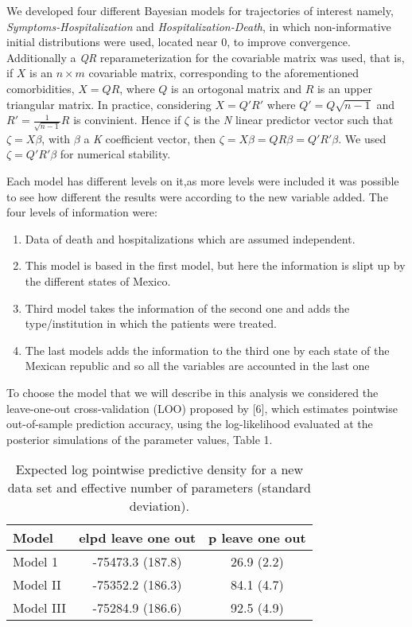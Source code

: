 \documentclass[10pt,letterpaper]{article}
\begin{document}
We developed four different Bayesian models for trajectories of interest
namely, \emph{Symptoms-Hospitalization} and
\emph{Hospitalization-Death}, in which non-informative initial
distributions were used, located near \(0\), to improve convergence.
Additionally a \textit{QR} reparameterization for the covariable matrix
was used, that is, if \(X\) is an \(n \times m\) covariable matrix,
corresponding to the aforementioned comorbidities, \(X=QR\), where \(Q\)
is an ortogonal matrix and \(R\) is an upper triangular matrix. In
practice, considering \(X=Q'R'\) where \(Q'=Q\sqrt{n-1}\) and
\(R'=\frac{1}{\sqrt{n-1}}R\) is convinient. Hence if \(\zeta\) is the
\textit{N} linear predictor vector such that \(\zeta=X\beta\), with
\(\beta\) a \textit{K} coefficient vector, then
\(\zeta=X\beta=QR\beta=Q'R'\beta\). We used \(\zeta=Q'R'\beta\) for
numerical stability.

Each model has different levels on it,as more levels were included it
was possible to see how different the results were according to the new
variable added. The four levels of information were:

\begin{enumerate}
  \item Data of death and hospitalizations which are assumed independent.
  \item This model is based in the first model, but here the information is slipt up by the different states of Mexico.
  \item Third model takes the information of the second one and adds the type/institution in which the patients were treated.
  \item The last models adds the information to the third one by each state of the Mexican republic and so all the variables are accounted in the last one
\end{enumerate}

To choose the model that we will describe in this analysis we considered
the leave-one-out cross-validation (LOO) proposed by {[}6{]}, which
estimates pointwise out-of-sample prediction accuracy, using the
log-likelihood evaluated at the posterior simulations of the parameter
values, Table 1.

\begin{table}[!htb]
\centering
\begin{tabular}{lcc}
\hline
{\textbf{Model}} & {\textbf{elpd leave one out}} & {\textbf{p leave one out}} \\
\hline Model 1  &  -75473.3 (187.8) & 26.9 (2.2) \\
Model II          &   -75352.2 (186.3) &  84.1 (4.7)\\
Model III         &    -75284.9 (186.6) &  92.5 (4.9)  \\
\hline
\end{tabular}
\caption{\label{tab:gof} Expected log pointwise predictive density for a new data set and effective number of parameters (standard deviation).}
\end{table}
\end{document}
